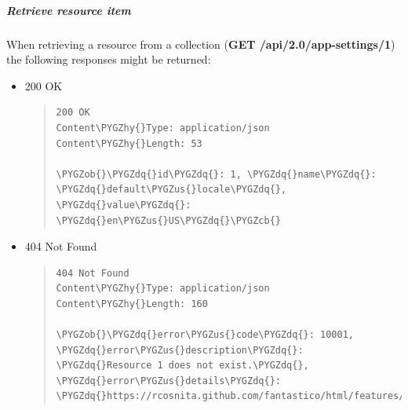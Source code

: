 \documentclass[letterpaper,10pt,english]{sphinxmanual}
\def\PYGZus{\char`\_}
\def\PYGZob{\char`\{}
\def\PYGZcb{\char`\}}
\def\PYGZhy{\char`\-}
\def\PYGZdq{\char`\"}
\begin{document}
\subparagraph{Retrieve resource item}
\label{features/roa/rest_responses:retrieve-resource-item}
When retrieving a resource from a collection (\textbf{GET /api/2.0/app-settings/1}) the following responses might be returned:
\begin{itemize}
\item {} 
200 OK
\begin{quote}

\begin{Verbatim}[commandchars=\\\{\}]
200 OK
Content\PYGZhy{}Type: application/json
Content\PYGZhy{}Length: 53

\PYGZob{}\PYGZdq{}id\PYGZdq{}: 1, \PYGZdq{}name\PYGZdq{}: \PYGZdq{}default\PYGZus{}locale\PYGZdq{}, \PYGZdq{}value\PYGZdq{}: \PYGZdq{}en\PYGZus{}US\PYGZdq{}\PYGZcb{}
\end{Verbatim}
\end{quote}

\item {} 
404 Not Found
\begin{quote}

\begin{Verbatim}[commandchars=\\\{\}]
404 Not Found
Content\PYGZhy{}Type: application/json
Content\PYGZhy{}Length: 160

\PYGZob{}\PYGZdq{}error\PYGZus{}code\PYGZdq{}: 10001, \PYGZdq{}error\PYGZus{}description\PYGZdq{}: \PYGZdq{}Resource 1 does not exist.\PYGZdq{}, \PYGZdq{}error\PYGZus{}details\PYGZdq{}: \PYGZdq{}https://rcosnita.github.com/fantastico/html/features/roa/1000x.html\PYGZdq{}\PYGZcb{}
\end{Verbatim}
\end{quote}

\end{itemize}
\end{document}
